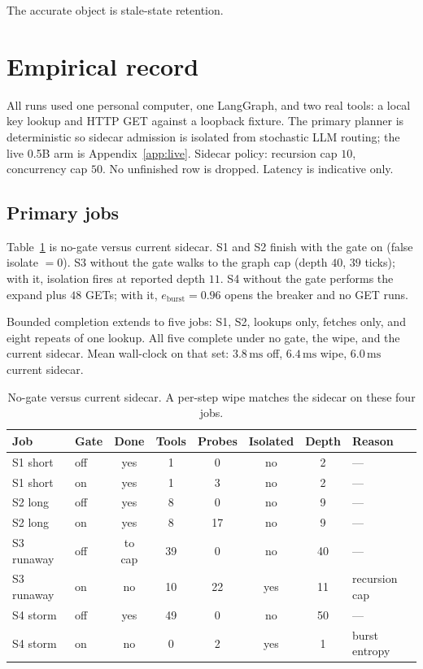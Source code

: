\documentclass[11pt,a4paper]{article}
\begin{document}
The accurate object is stale-state retention.

\section{Empirical record}

All runs used one personal computer, one LangGraph, and two real tools: a local key lookup and HTTP GET against a loopback fixture.
The primary planner is deterministic so sidecar admission is isolated from stochastic LLM routing; the live 0.5B arm is Appendix~\ref{app:live}.
Sidecar policy: recursion cap $10$, concurrency cap $50$.
No unfinished row is dropped.
Latency is indicative only.

\subsection{Primary jobs}

Table~\ref{tab:primary} is no-gate versus current sidecar.
S1 and S2 finish with the gate on (false isolate $=0$).
S3 without the gate walks to the graph cap (depth $40$, $39$ ticks); with it, isolation fires at reported depth $11$.
S4 without the gate performs the expand plus $48$ GETs; with it, $e_{\mathrm{burst}}=0.96$ opens the breaker and no GET runs.

Bounded completion extends to five jobs: S1, S2, lookups only, fetches only, and eight repeats of one lookup.
All five complete under no gate, the wipe, and the current sidecar.
Mean wall-clock on that set: $3.8\,\mathrm{ms}$ off, $6.4\,\mathrm{ms}$ wipe, $6.0\,\mathrm{ms}$ current sidecar.

\begin{table}[htbp]
\centering
\caption{No-gate versus current sidecar. A per-step wipe matches the sidecar on these four jobs.}
\label{tab:primary}
\small
\begin{tabular}{@{}llcccccl@{}}
\toprule
Job & Gate & Done & Tools & Probes & Isolated & Depth & Reason \\
\midrule
S1 short & off & yes & 1 & 0 & no & 2 & --- \\
S1 short & on & yes & 1 & 3 & no & 2 & --- \\
S2 long & off & yes & 8 & 0 & no & 9 & --- \\
S2 long & on & yes & 8 & 17 & no & 9 & --- \\
S3 runaway & off & to cap & 39 & 0 & no & 40 & --- \\
S3 runaway & on & no & 10 & 22 & yes & 11 & recursion cap \\
S4 storm & off & yes & 49 & 0 & no & 50 & --- \\
S4 storm & on & no & 0 & 2 & yes & 1 & burst entropy \\
\bottomrule
\end{tabular}
\end{table}
\end{document}
